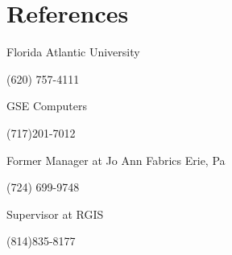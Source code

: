 \documentclass[letterpaper]{resume}
\begin{document}
\section{References}


\begin{compactitem}
\item Florida Atlantic University
\item (620) 757-4111
\end{compactitem}


\begin{compactitem}
\item GSE Computers
\item (717)201-7012
\end{compactitem}

\begin{compactitem}
\item Former Manager at Jo Ann Fabrics Erie, Pa
\item (724) 699-9748
\end{compactitem}

\begin{compactitem}
\item Supervisor at RGIS
\item (814)835-8177
\end{compactitem}

\end{document}
